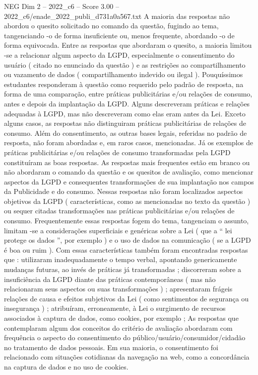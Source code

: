 \begin{textsample}{NEG Dim 2 – 2022\_c6 – Score 3.00 – 2022\_c6/enade\_2022\_publi\_d731a0a567.txt}
A maioria das respostas não abordou o quesito solicitado no comando da questão, fugindo ao tema, tangenciando -o de forma insuficiente ou, menos frequente, abordando -o de forma equivocada.
Entre as respostas que abordaram o quesito, a maioria limitou -se a relacionar algum aspecto da LGPD, especialmente o consentimento do usuário ( citado no enunciado da questão ) e as restrições ao compartilhamento ou vazamento de dados ( compartilhamento indevido ou ilegal ).
Pouquíssimos estudantes responderam à questão como requerido pelo padrão de resposta, na forma de uma comparação, entre práticas publicitárias e/ou relações de consumo, antes e depois da implantação da LGPD.
Alguns descreveram práticas e relações adequadas à LGPD, mas não descreveram como elas eram antes da Lei.
Exceto alguns casos, as respostas não distinguiram práticas publicitárias de relações de consumo.
Além do consentimento, as outras bases legais, referidas no padrão de resposta, não foram abordadas e, em raros casos, mencionadas.
Já os exemplos de práticas publicitárias e/ou relações de consumo transformadas pela LGPD constituíram as boas respostas.
As respostas mais frequentes estão em branco ou não abordaram o comando da questão e os quesitos de avaliação, como mencionar aspectos da LGPD e consequentes transformações de sua implantação nos campos da Publicidade e do consumo.
Nessas respostas não foram localizados aspectos objetivos da LGPD ( características, como as mencionadas no texto da questão ) ou sequer citadas transformações nas práticas publicitárias e/ou relações de consumo.
Frequentemente essas respostas fogem do tema, tangenciam o assunto, limitam -se a considerações superficiais e genéricas sobre a Lei ( que a “ lei protege os dados ”, por exemplo ) e o uso de dados na comunicação ( se a LGPD é boa ou ruim ).
Com essas características também foram encontradas respostas que : utilizaram inadequadamente o tempo verbal, apontando genericamente mudanças futuras, ao invés de práticas já transformadas ; discorreram sobre a insuficiência da LGPD diante das práticas contemporâneas ( mas não relacionaram seus aspectos ou suas transformações ) ; apresentaram frágeis relações de causa e efeitos subjetivos da Lei ( como sentimentos de segurança ou insegurança ) ; atribuíram, erroneamente, à Lei o surgimento de recursos associados à captura de dados, como cookies, por exemplo ; As respostas que contemplaram algum dos conceitos do critério de avaliação abordaram com frequência o aspecto do consentimento do público/usuário/consumidor/cidadão no tratamento de dados pessoais.
Em sua maioria, o consentimento foi relacionado com situações cotidianas da navegação na web, como a concordância na captura de dados e no uso de cookies.

\end{textsample}
